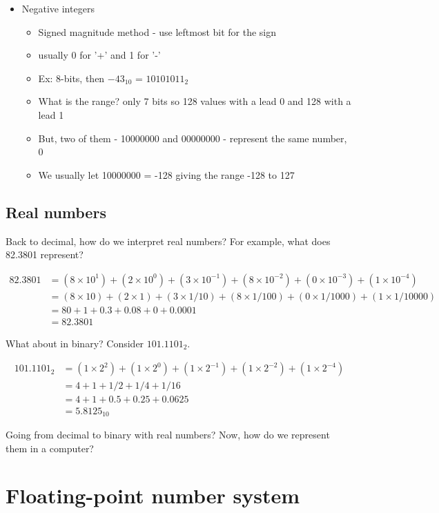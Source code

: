 \documentclass [titlepage,12pt,letter] {article}
\begin{document}
\begin{itemize}
\item{Negative integers}
\begin{itemize}
\item{Signed magnitude method - use leftmost bit for the sign}
\item{usually 0 for '+' and 1 for '-'}
\item{Ex: 8-bits, then $-43_{10}$ = $10101011_{2}$}
\item{What is the range? only 7 bits so 128 values with a lead 0 and 128 with a lead 1}
\item{But, two of them - 10000000 and 00000000 - represent the same number, 0}
\item{We usually let 10000000 = -128 giving the range -128 to 127}
\end{itemize}
\end{itemize}


\subsection{Real numbers}
Back to decimal, how do we interpret real numbers? For example, what does 82.3801 represent?

\begin{align*}
82.3801 &= (8 \times 10^1) + (2 \times 10^0) + (3 \times 10^{-1}) + (8 \times 10^{-2}) + (0 \times 10^{-3}) + (1 \times 10^{-4}) \\
&= (8 \times 10) + (2 \times 1) + (3 \times 1/10) + (8 \times 1/100) + (0 \times 1/1000) + (1 \times 1/10000) \\
&= 80 + 1 + 0.3 + 0.08 + 0 + 0.0001 \\
&= 82.3801
\end{align*}

\noindent
What about in binary? Consider $101.1101_2$.

\begin{align*}
101.1101_2 &= (1 \times 2^2) + (1 \times 2^0) + (1 \times 2^{-1}) + (1 \times 2^{-2}) + (1 \times 2^{-4}) \\
&= 4 + 1 + 1/2 + 1/4 + 1/16 \\
&= 4 + 1 + 0.5 + 0.25 + 0.0625 \\
&= 5.8125_{10}
\end{align*}

Going from decimal to binary with real numbers?
Now, how do we represent them in a computer?



\section{Floating-point number system} 
\end{document}
